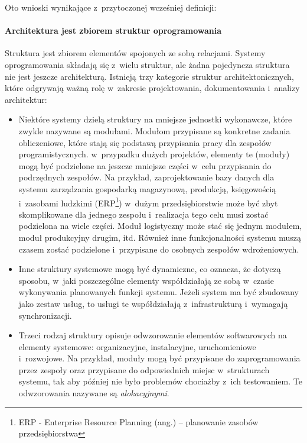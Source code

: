 Oto wnioski wynikające z~przytoczonej wcześniej definicji:

\paragraph{Architektura jest zbiorem struktur oprogramowania}

Struktura jest zbiorem elementów spojonych ze sobą relacjami. Systemy oprogramowania składają się z~wielu struktur, ale żadna pojedyncza struktura nie jest jeszcze architekturą. Istnieją trzy kategorie struktur architektonicznych, które odgrywają ważną rolę w~zakresie projektowania, dokumentowania i~analizy architektur:
\begin{itemize}
\item
Niektóre systemy dzielą struktury na mniejsze jednostki wykonawcze, które zwykle nazywane są modułami. Modułom przypisane są konkretne zadania obliczeniowe, które stają się podstawą przypisania pracy dla zespołów programistycznych. w~przypadku dużych projektów, elementy te (moduły) mogą być podzielone na jeszcze mniejsze części w~celu przypisania do podrzędnych zespołów. Na przykład, zaprojektowanie bazy danych dla systemu zarządzania gospodarką magazynową, produkcją, księgowością i~zasobami ludzkimi (ERP\footnote{ERP - Enterprise Resource Planning (ang.) – planowanie zasobów przedsiębiorstwa}) w~dużym przedsiębiorstwie może być zbyt skomplikowane dla jednego zespołu i~realizacja tego celu musi zostać podzielona na wiele części. Moduł logistyczny może stać się jednym modułem, moduł produkcyjny drugim, itd. Również inne funkcjonalności systemu muszą czasem zostać podzielone i~przypisane do osobnych zespołów wdrożeniowych.
\item
Inne struktury systemowe mogą być dynamiczne, co oznacza, że dotyczą sposobu, w~jaki poszczególne elementy współdziałają ze sobą w~czasie wykonywania planowanych funkcji systemu. Jeżeli system ma być zbudowany jako zestaw usług, to usługi te współdziałają z~infrastrukturą i~wymagają synchronizacji. 

\item
Trzeci rodzaj struktury opisuje odwzorowanie elementów softwarowych na elementy systemowe: organizacyjne, instalacyjne, uruchomieniowe i~rozwojowe. Na przykład, moduły mogą być przypisane do zaprogramowania przez zespoły oraz przypisane do odpowiednich miejsc w~strukturach systemu, tak aby później nie było problemów chociażby z~ich testowaniem.
Te odwzorowania nazywane są \textit{alokacyjnymi}.

\end{itemize}

